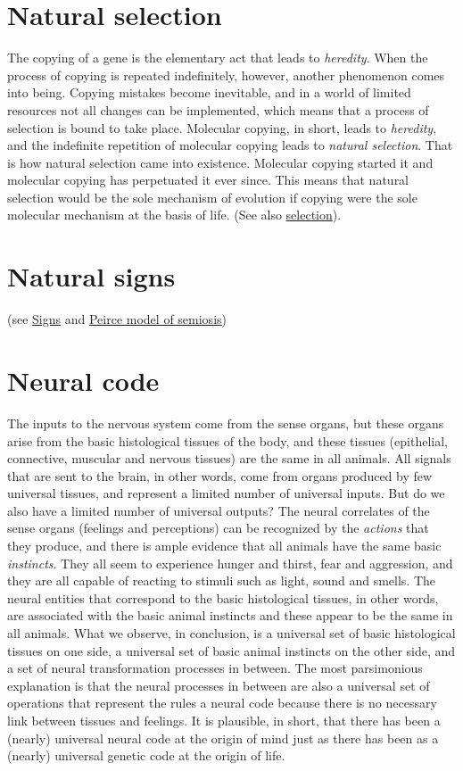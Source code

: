 \documentclass[12pt]{article}
\begin{document}
\section{Natural selection}
The copying of a gene is the elementary act that leads to \textit{heredity}. When the process of copying is repeated indefinitely, however, another phenomenon comes into being. Copying mistakes become inevitable, and in a world of limited resources not all changes can be implemented, which means that a process of selection is bound to take place. Molecular copying, in short, leads to \textit{heredity}, and the indefinite repetition of molecular copying leads to \textit{natural selection}. That is how natural selection came into existence. Molecular copying started it and molecular copying has perpetuated it ever since. This means that natural selection would be the sole mechanism of evolution if copying were the sole molecular mechanism at the basis of life. (See also \hyperlink{selection}{selection}).


\section{Natural signs} (see \hyperlink{signs}{Signs} and \hyperlink{peirce_model_of_semiosis}{Peirce model of semiosis}) 


\section{Neural code}
The inputs to the nervous system come from the sense organs, but these organs arise from the basic histological tissues of the body, and these tissues (epithelial, connective, muscular and nervous tissues) are the same in all animals. All signals that are sent to the brain, in other words, come from organs produced by few universal tissues, and represent a limited number of universal inputs. But do we also have a limited number of universal outputs? The neural correlates of the sense organs (feelings and perceptions) can be recognized by the \textit{actions} that they produce, and there is ample evidence that all animals have the same basic \textit{instincts}. They all seem to experience hunger and thirst, fear and aggression, and they are all capable of reacting to stimuli such as light, sound and smells. The neural entities that correspond to the basic histological tissues, in other words, are associated with the basic animal instincts and these appear to be the same in all animals. What we observe, in conclusion, is a universal set of basic histological tissues on one side, a universal set of basic animal instincts on the other side, and a set of neural transformation processes in between. The most parsimonious explanation is that the neural processes in between are also a universal set of operations that represent the rules a neural code because there is no necessary link between tissues and feelings. It is plausible, in short, that there has been a (nearly) universal neural code at the origin of mind just as there has been as a (nearly) universal genetic code at the origin of life. 
\end{document}
